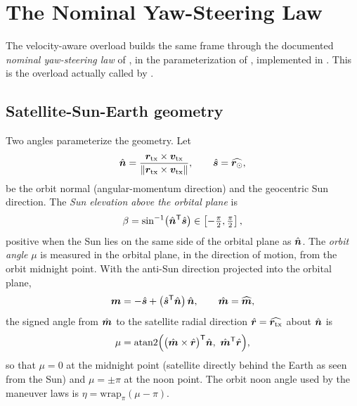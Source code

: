 \section{The Nominal Yaw-Steering Law}
\label{sec:lb-yaw}

The velocity-aware overload
 builds the same frame through
the documented \emph{nominal yaw-steering law} of \citet{kouba2009yaw}, in the
parameterization of \citep[Eq.~(1)]{cheng2025yaw}, implemented in
.  This is the overload actually
called by .

\subsection{Satellite-Sun-Earth geometry}
\label{sec:lb-yaw-geometry}

Two angles parameterize the geometry.  Let
\begin{equation}
  \hat{\bm{n}}
  = \frac{\bm{r}_\mathrm{tx} \times \bm{v}_\mathrm{tx}}
         {\lVert \bm{r}_\mathrm{tx} \times \bm{v}_\mathrm{tx} \rVert},
  \qquad
  \hat{\bm{s}} = \widehat{\bm{r}_\odot},
  \label{eq:lb-orbit-normal}
\end{equation}
be the orbit normal (angular-momentum direction) and the geocentric Sun
direction.  The \emph{Sun elevation above the orbital plane} is
\begin{equation}
  \beta = \sin^{-1}\!\big(\hat{\bm{n}}^{\mathsf{T}} \hat{\bm{s}}\big)
  \in \left[-\tfrac{\pi}{2}, \tfrac{\pi}{2}\right],
  \label{eq:lb-beta}
\end{equation}
positive when the Sun lies on the same side of the orbital plane as
$\hat{\bm{n}}$.  The \emph{orbit angle} $\mu$ is measured in the orbital plane, in
the direction of motion, from the orbit midnight point.  With the anti-Sun
direction projected into the orbital plane,
\begin{equation}
  \bm{m} = -\hat{\bm{s}} + \big(\hat{\bm{s}}^{\mathsf{T}}\hat{\bm{n}}\big)\,\hat{\bm{n}},
  \qquad
  \hat{\bm{m}} = \widehat{\bm{m}},
  \label{eq:lb-midnight}
\end{equation}
the signed angle from $\hat{\bm{m}}$ to the satellite radial direction
$\hat{\bm{r}} = \widehat{\bm{r}_\mathrm{tx}}$ about $\hat{\bm{n}}$ is
\begin{equation}
  \mu
  = \operatorname{atan2}\!\Big(
      \big(\hat{\bm{m}} \times \hat{\bm{r}}\big)^{\mathsf{T}} \hat{\bm{n}},\
      \hat{\bm{m}}^{\mathsf{T}} \hat{\bm{r}}
    \Big),
  \label{eq:lb-mu}
\end{equation}
so that $\mu = 0$ at the midnight point (satellite directly behind the Earth as
seen from the Sun) and $\mu = \pm\pi$ at the noon point.  The orbit noon angle
used by the maneuver laws is $\eta = \mathrm{wrap}_\pi(\mu - \pi)$.

